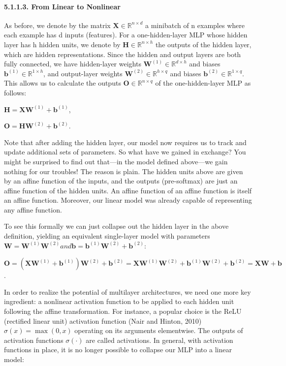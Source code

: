 \documentclass[11pt]{article}
\begin{document}
    \paragraph{5.1.1.3. From Linear to \mbox{}
Nonlinear}\label{from-linear-to-nonlinear}

    As before, we denote by the matrix
\(\mathbf{X} \in \mathbb{R}^{n \times d}\) a minibatch of n examples
where each example has d inputs (features). For a one-hidden-layer MLP
whose hidden layer has h hidden units, we denote by
\(\mathbf{H} \in \mathbb{R}^{n \times h}\) the outputs of the hidden
layer, which are hidden representations. Since the hidden and output
layers are both fully connected, we have hidden-layer weights
\(\mathbf{W}^{(1)} \in \mathbb{R}^{d \times h}\) and biases
\(\mathbf{b}^{(1)} \in \mathbb{R}^{1 \times h}\), and output-layer
weights \(\mathbf{W}^{(2)} \in \mathbb{R}^{h \times q}\) and biases
\(\mathbf{b}^{(2)} \in \mathbb{R}^{1 \times q}\). This allows us to
calculate the outputs \(\mathbf{O} \in \mathbb{R}^{n \times q}\) of the
one-hidden-layer MLP as follows:

\(\mathbf{H} = \mathbf{X}\mathbf{W}^{(1)} + \mathbf{b}^{(1)}\),

\(\mathbf{O} = \mathbf{H}\mathbf{W}^{(2)} + \mathbf{b}^{(2)}\).

Note that after adding the hidden layer, our model now requires us to
track and update additional sets of parameters. So what have we gained
in exchange? You might be surprised to find out that---in the model
defined above---we gain nothing for our troubles! The reason is plain.
The hidden units above are given by an affine function of the inputs,
and the outputs (pre-softmax) are just an affine function of the hidden
units. An affine function of an affine function is itself an affine
function. Moreover, our linear model was already capable of representing
any affine function.

To see this formally we can just collapse out the hidden layer in the
above definition, yielding an equivalent single-layer model with
parameters
\(\mathbf{W} = \mathbf{W}^{(1)}\mathbf{W}^{(2)} and \mathbf{b} = \mathbf{b}^{(1)}\mathbf{W}^{(2)} + \mathbf{b}^{(2)}\):

\(\mathbf{O} = (\mathbf{X}\mathbf{W}^{(1)} + \mathbf{b}^{(1)})\mathbf{W}^{(2)} + \mathbf{b}^{(2)} = \mathbf{X}\mathbf{W}^{(1)}\mathbf{W}^{(2)} + \mathbf{b}^{(1)}\mathbf{W}^{(2)} + \mathbf{b}^{(2)} = \mathbf{X}\mathbf{W} + \mathbf{b}\).

In order to realize the potential of multilayer architectures, we need
one more key ingredient: a nonlinear activation function \sigma to be
applied to each hidden unit following the affine transformation. For
instance, a popular choice is the ReLU (rectified linear unit)
activation function (Nair and Hinton, 2010) \(\sigma(x) = \max(0, x)\)
operating on its arguments elementwise. The outputs of activation
functions \(\sigma(\cdot)\) are called activations. In general, with
activation functions in place, it is no longer possible to collapse our
MLP into a linear model:
\end{document}
